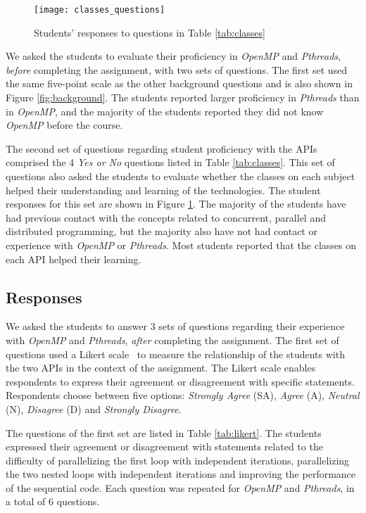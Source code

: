 \begin{figure}[htpb]
    \vspace{-0.7em}
    \centering
    \texttt{[image: classes\_questions]}
    \caption{Students' responses to questions in Table \ref{tab:classes}}
    \label{fig:classes}
    \vspace{-1em}
\end{figure}

We asked the students to evaluate their proficiency in \textit{OpenMP} and
\textit{Pthreads}, \textit{before} completing the assignment, with two sets of
questions. The first set used the same five-point scale as the other background
questions and is also shown in Figure \ref{fig:background}. The students
reported larger proficiency in \textit{Pthreads} than in
\textit{OpenMP}, and the majority of the students reported they did not know
\textit{OpenMP} before the course.

The second set of questions regarding student proficiency with the APIs
comprised the 4 \textit{Yes or No} questions listed in Table \ref{tab:classes}.
This set of questions also asked the students to evaluate whether the classes
on each subject helped their understanding and learning of the technologies.
The student responses for this set are shown in Figure \ref{fig:classes}.  The
majority of the students have had previous contact with the concepts related to
concurrent, parallel and distributed programming, but the majority also have
not had contact or experience with \textit{OpenMP} or \textit{Pthreads}.  Most
students reported that the classes on each API helped their learning.

\subsection{Responses}

We asked the students to answer 3 sets of questions regarding their experience
with \textit{OpenMP} and \textit{Pthreads}, \textit{after} completing the
assignment.  The first set of questions used a Likert
scale~\cite{likert1932technique} to measure the relationship of the students
with the two APIs in the context of the assignment. The Likert scale enables
respondents to express their agreement or disagreement with specific
statements. Respondents choose between five options: \textit{Strongly Agree}
(SA), \textit{Agree} (A), \textit{Neutral} (N), \textit{Disagree} (D) and
\textit{Strongly Disagree}.

The questions of the first set are listed in Table \ref{tab:likert}. The
students expressed their agreement or disagreement with statements related to
the difficulty of parallelizing the first loop with independent iterations,
parallelizing the two nested loops with independent iterations and improving
the performance of the sequential code. Each question was repeated for
\textit{OpenMP} and \textit{Pthreads}, in a total of $6$ questions.

